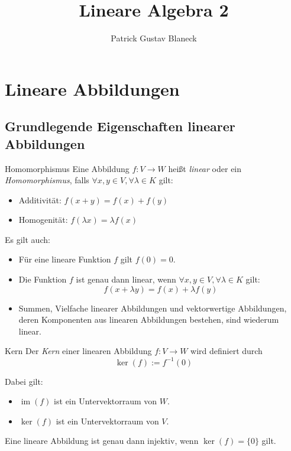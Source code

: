 \documentclass[german]{../spicker}
\title{Lineare Algebra 2}
\author{Patrick Gustav Blaneck}
\newcommand{\im}{\operatorname{im}}
\begin{document}
\maketitle
\tableofcontents
\newpage


\section{Lineare Abbildungen}

\subsection{Grundlegende Eigenschaften linearer Abbildungen}

\begin{defi}{Homomorphismus}
    Eine Abbildung $f : V \to W$ heißt \emph{linear} oder ein \emph{Homomorphismus}, falls $\forall x, y \in V, \forall \lambda \in K$ gilt:
    \begin{itemize}
        \item Additivität: $f(x + y) = f(x) + f(y)$
        \item Homogenität: $f(\lambda x) = \lambda f(x)$
    \end{itemize}

    Es gilt auch:
    \begin{itemize}
        \item Für eine lineare Funktion $f$ gilt $f(0) = 0$.
        \item Die Funktion $f$ ist genau dann linear, wenn $\forall x, y \in V, \forall \lambda \in K$ gilt:
              $$
                  f(x + \lambda y) = f(x) + \lambda f(y)
              $$
        \item Summen, Vielfache linearer Abbildungen und vektorwertige Abbildungen, deren Komponenten aus linearen Abbildungen bestehen, sind wiederum linear.
    \end{itemize}
\end{defi}

\begin{defi}{Kern}
    Der \emph{Kern} einer linearen Abbildung $f : V \to W$ wird definiert durch
    $$
        \ker (f) := f^{-1}(0)
    $$

    Dabei gilt:
    \begin{itemize}
        \item $\im (f)$ ist ein Untervektorraum von $W$.
        \item $\ker (f)$ ist ein Untervektorraum von $V$.
    \end{itemize}

    Eine lineare Abbildung ist genau dann injektiv, wenn $\ker (f) = \{0\}$ gilt.
\end{defi}
\end{document}

